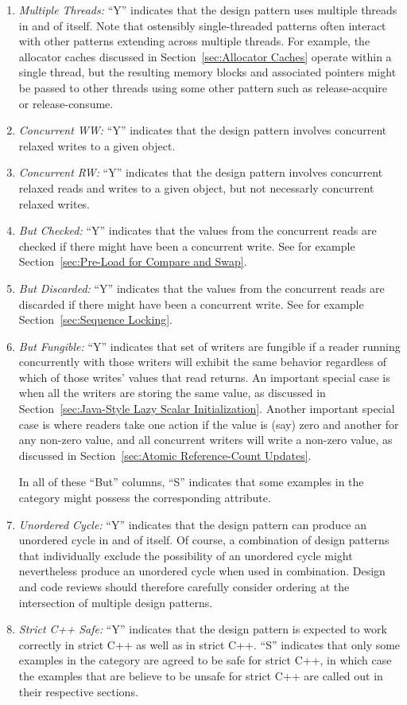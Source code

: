 \documentclass[10]{article}
\begin{document}
\begin{enumerate}
\item	\emph{Multiple Threads:}  ``Y'' indicates that the design pattern
	uses multiple threads in and of itself.
	Note that ostensibly single-threaded patterns often interact
	with other patterns extending across multiple threads.
	For example, the allocator caches discussed in
	Section~\ref{sec:Allocator Caches}
	operate within a single thread, but the resulting memory blocks
	and associated pointers might be passed to other threads using
	some other pattern such as release-acquire or release-consume.
\item	\emph{Concurrent WW:}  ``Y'' indicates that the design pattern
	involves concurrent relaxed writes to a given object.
\item	\emph{Concurrent RW:}  ``Y'' indicates that the design pattern
	involves concurrent relaxed reads and writes to a given object,
	but not necessarly concurrent relaxed writes.
\item	\emph{But Checked:}  ``Y'' indicates that the values from
	the concurrent reads are checked if there might have been a
	concurrent write.  See for example
	Section~\ref{sec:Pre-Load for Compare and Swap}.
\item	\emph{But Discarded:}  ``Y'' indicates that the values from
	the concurrent reads are discarded if there might have been a
	concurrent write.
	See for example Section~\ref{sec:Sequence Locking}.
\item	\emph{But Fungible:}  ``Y'' indicates that set of writers are
	fungible if a reader running concurrently with those writers will
	exhibit the same behavior regardless of which of those writes'
	values that read returns.
	An important special case is when all the writers are storing
	the same value, as discussed in
	Section~\ref{sec:Java-Style Lazy Scalar Initialization}.
	Another important special case is where readers take one
	action if the value is (say) zero and another for any
	non-zero value, and all concurrent writers will write
	a non-zero value, as discussed in
	Section~\ref{sec:Atomic Reference-Count Updates}.

	In all of these ``But'' columns, ``S'' indicates
	that some examples in the category might possess the corresponding
	attribute.
\item	\emph{Unordered Cycle:}  ``Y'' indicates that the design pattern
	can produce an unordered cycle in and of itself.
	Of course, a combination of design patterns that individually
	exclude the possibility of an unordered cycle might nevertheless
	produce an unordered cycle when used in combination.
	Design and code reviews should therefore carefully consider
	ordering at the intersection of multiple design patterns.
\item	\emph{Strict C++ Safe:} ``Y'' indicates that the design pattern is
	expected to work correctly in strict C++ as well as in strict C++.
	``S'' indicates that only some examples in the category are
	agreed to be safe for strict C++, in which case the examples
	that are believe to be unsafe for strict C++ are called out in
	their respective sections.
\end{enumerate}
\end{document}
